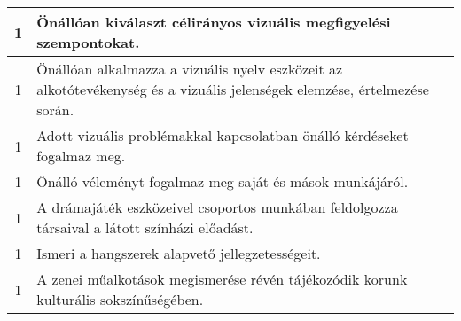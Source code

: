 \begin{longtable}{c | p{12cm} }
                                          1 &  Önállóan kiválaszt célirányos vizuális megfigyelési szempontokat. \\ \hline
                                          1 &  Önállóan alkalmazza a vizuális nyelv eszközeit az alkotótevékenység és a vizuális jelenségek elemzése, értelmezése során. \\ \hline
                                          1 &  Adott vizuális problémakkal kapcsolatban önálló kérdéseket fogalmaz meg. \\ \hline
                                          1 &  Önálló véleményt fogalmaz meg saját és mások munkájáról. \\ \hline
                                          1 &  A drámajáték eszközeivel csoportos munkában feldolgozza társaival a látott színházi előadást. \\ \hline
                                          1 &  Ismeri a hangszerek alapvető jellegzetességeit. \\ \hline
                                          1 &  A zenei műalkotások megismerése révén tájékozódik korunk kulturális sokszínűségében. \\ \hline
                                      

\end{longtable}
